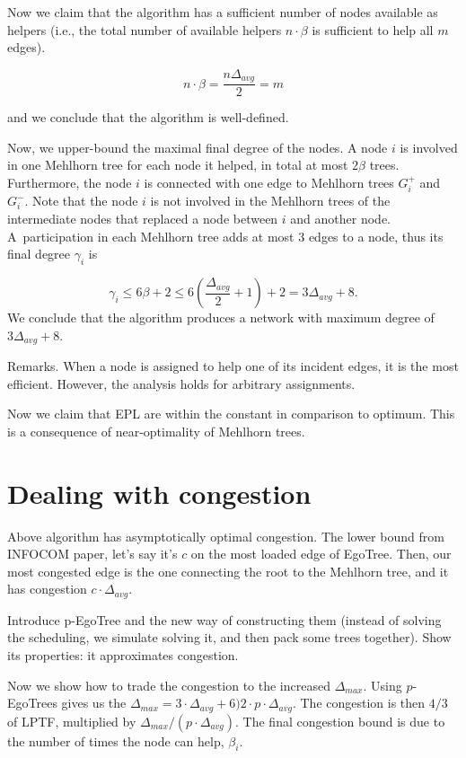 \documentclass{article}
\begin{document}
\medskip

Now we claim that the algorithm has a sufficient number of nodes available as helpers 
 (i.e., the total number of available helpers $n \cdot \beta$ is sufficient to help all $m$ edges).

  $$n \cdot \beta = \frac{n\Delta_{avg}}{2} = m$$

and we conclude that the algorithm is well-defined.

\medskip
\newpage
Now, we upper-bound the maximal final degree of the nodes.
A node $i$ is involved in one Mehlhorn tree
for each node it helped, in total at most $2\beta$ trees.
Furthermore, the node $i$ is connected with one edge to Mehlhorn trees $G_i^+$ and $G_i^-$.
Note that the node $i$ is not involved in the Mehlhorn trees of the intermediate nodes
that replaced a node between $i$ and another node.
A~participation in each Mehlhorn tree adds at most $3$ edges to a node, thus its final degree $\gamma_i$ is

$$\gamma_i \leq 6\beta + 2 \leq 6 \left(\frac{\Delta_{avg}}{2}+1\right) + 2 =  3\Delta_{avg} + 8.$$
%
We conclude that the algorithm produces a network
with maximum degree of $3\Delta_{avg} + 8$.

Remarks.
When a node is assigned to help one of its incident edges, it is the most efficient.
However, the analysis holds for arbitrary assignments.

Now we claim that EPL are within the constant in comparison to optimum.
This is a consequence of near-optimality of Mehlhorn trees.

\section{Dealing with congestion}

Above algorithm has asymptotically optimal congestion.
The lower bound from INFOCOM paper, let's say it's $c$ on the most loaded edge of EgoTree.
Then, our most congested edge is the one connecting the root to the Mehlhorn tree, and it has congestion $c \cdot \Delta_{avg}$.

Introduce p-EgoTree and the new way of constructing them (instead of solving the scheduling, we simulate solving it, and then pack some trees together).
Show its properties: it approximates congestion.

Now we show how to trade the congestion to the increased $\Delta_{max}$.
Using $p$-EgoTrees gives us the $\Delta_{max} = 3\cdot \Delta_{avg} + 6 ) 2 \cdot p \cdot \Delta_{avg}$.
The congestion is then $4/3$ of LPTF, multiplied by $\Delta_{max} / (p \cdot \Delta_{avg})$.
The final congestion bound is due to the number of times the node can help, $\beta_i$.
\end{document}
